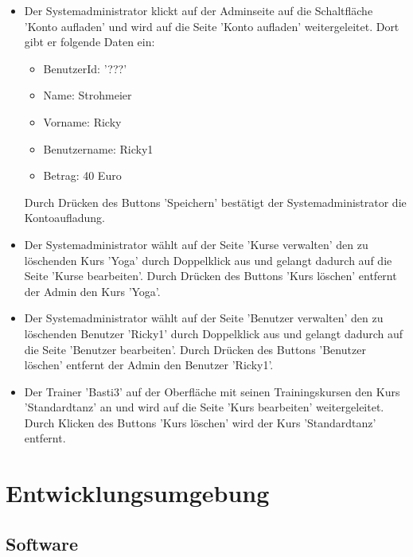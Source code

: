 \documentclass[a4paper]{scrreprt}
\begin{document}
\begin{itemize}
				\item {}
				Der Systemadministrator klickt auf der Adminseite auf die Schaltfläche 'Konto aufladen' und wird auf die Seite 'Konto aufladen' weitergeleitet. Dort gibt er folgende Daten ein:
					\begin{itemize}
						\item BenutzerId: '???'
						\item Name: Strohmeier
						\item Vorname: Ricky
						\item Benutzername: Ricky1
						\item Betrag: 40 Euro
					\end{itemize}
				Durch Drücken des Buttons 'Speichern' bestätigt der Systemadministrator die Kontoaufladung.
				
				\item {}
				Der Systemadministrator wählt auf der Seite 'Kurse verwalten' den zu löschenden Kurs 'Yoga' durch Doppelklick aus und gelangt dadurch auf die Seite 'Kurse bearbeiten'. Durch Drücken des Buttons 'Kurs löschen' entfernt der Admin den Kurs 'Yoga'.
				
				
				\item {}
				Der Systemadministrator wählt auf der Seite 'Benutzer verwalten' den zu löschenden Benutzer 'Ricky1' durch Doppelklick aus und gelangt dadurch auf die Seite 'Benutzer bearbeiten'. Durch Drücken des Buttons 'Benutzer löschen' entfernt der Admin den Benutzer 'Ricky1'.
				
				\item {}
				Der Trainer 'Basti3' auf der Oberfläche mit seinen Trainingskursen den Kurs 'Standardtanz' an und wird auf die Seite 'Kurs bearbeiten' weitergeleitet. Durch Klicken des Buttons 'Kurs löschen' wird der Kurs 'Standardtanz' entfernt.
				
			\end{itemize}





\chapter{Entwicklungsumgebung}
    \section{Software}
\end{document}
